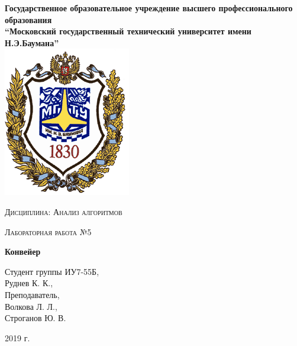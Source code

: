 \documentclass[a4paper,12pt]{report}
\begin{document}
    \begin{titlepage}

        \begin{center}
            \large
            \textbf{Государственное образовательное учреждение высшего профессионального образования\\
            “Московский государственный технический университет имени Н.Э.Баумана”\\}
            \includegraphics{bmstu-logo.png}
			\vspace{1cm}
            
            \textsc{Дисциплина: Анализ алгоритмов}
            \vspace{0.5cm}
                
            \textsc{Лабораторная работа №5}
            \vspace{1cm}
            
            {\LARGE \textbf{Конвейер}}
            \vspace{3cm}
                    
            \begin{flushright}
            	Студент группы ИУ7-55Б,\\   
            	Руднев К. К.,\\
            	\vspace{0.5cm}
            	Преподаватель,\\
            	Волкова Л. Л.,\\
            	Строганов Ю. В.
            	
            \end{flushright}
            \vfill
            
            2019 г.
            
            \end{center}

    \end{titlepage}
\end{document}

